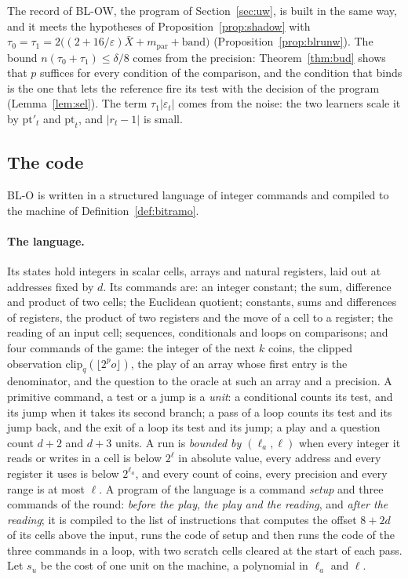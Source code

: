 \documentclass[11pt]{amsart}
\theoremstyle{definition}
\numberwithin{equation}{section}
\begin{document}
The record of BL-OW, the program of Section~\ref{sec:uw}, is built in the same way, and it meets the hypotheses of Proposition~\ref{prop:shadow} with $\tau_0=\tau_1=2\bigl((2+16/\varepsilon)\bar X+m_{\mathrm{par}}+\mathrm{band}\bigr)$ (Proposition~\ref{prop:blrunw}). The bound $n(\tau_0+\tau_1)\le\delta/8$ comes from the precision: Theorem~\ref{thm:bud} shows that $p$ suffices for every condition of the comparison, and the condition that binds is the one that lets the reference fire its test with the decision of the program (Lemma~\ref{lem:sel}). The term $\tau_1|\varepsilon_t|$ comes from the noise: the two learners scale it by $\mathrm{pt}'_t$ and $\mathrm{pt}_t$, and $|r_t-1|$ is small.

\subsection{The code}\label{sec:bit-transfer}

BL-O is written in a structured language of integer commands and compiled to the machine of Definition~\ref{def:bitramo}.

\paragraph{The language.} Its states hold integers in scalar cells, arrays and natural registers, laid out at addresses fixed by $d$. Its commands are: an integer constant; the sum, difference and product of two cells; the Euclidean quotient; constants, sums and differences of registers, the product of two registers and the move of a cell to a register; the reading of an input cell; sequences, conditionals and loops on comparisons; and four commands of the game: the integer of the next $k$ coins, the clipped observation $\mathrm{clip}_q(\lfloor2^po\rfloor)$, the play of an array whose first entry is the denominator, and the question to the oracle at such an array and a precision. A primitive command, a test or a jump is a \emph{unit}: a conditional counts its test, and its jump when it takes its second branch; a pass of a loop counts its test and its jump back, and the exit of a loop its test and its jump; a play and a question count $d+2$ and $d+3$ units. A run is \emph{bounded by $(\ell_a,\ell)$} when every integer it reads or writes in a cell is below $2^\ell$ in absolute value, every address and every register it uses is below $2^{\ell_a}$, and every count of coins, every precision and every range is at most $\ell$. A program of the language is a command \emph{setup} and three commands of the round: \emph{before the play}, \emph{the play and the reading}, and \emph{after the reading}; it is compiled to the list of instructions that computes the offset $8+2d$ of its cells above the input, runs the code of setup and then runs the code of the three commands in a loop, with two scratch cells cleared at the start of each pass. Let $s_u$ be the cost of one unit on the machine, a polynomial in $\ell_a$ and $\ell$.
\end{document}
